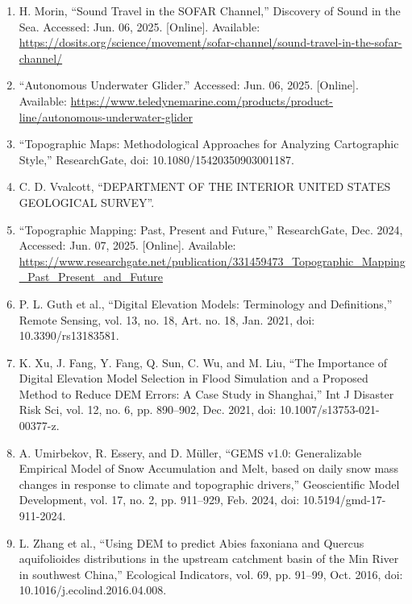 \documentclass{article}
\begin{document}
\begin{sloppypar}
\begin{enumerate}
    \item{H. Morin, “Sound Travel in the SOFAR Channel,” Discovery of Sound in the Sea. Accessed: Jun. 06, 2025. [Online]. Available: \url{https://dosits.org/science/movement/sofar-channel/sound-travel-in-the-sofar-channel/}}

    \item{“Autonomous Underwater Glider.” Accessed: Jun. 06, 2025. [Online]. Available: \url{https://www.teledynemarine.com/products/product-line/autonomous-underwater-glider}}

    \item{“Topographic Maps: Methodological Approaches for Analyzing Cartographic Style,” ResearchGate, doi: 10.1080/15420350903001187.}

    \item{C. D. Vvalcott, “DEPARTMENT OF THE INTERIOR UNITED STATES GEOLOGICAL SURVEY”.}

    \item{“Topographic Mapping: Past, Present and Future,” ResearchGate, Dec. 2024, Accessed: Jun. 07, 2025. [Online]. Available: \url{https://www.researchgate.net/publication/331459473_Topographic_Mapping_Past_Present_and_Future}}

    \item{P. L. Guth et al., “Digital Elevation Models: Terminology and Definitions,” Remote Sensing, vol. 13, no. 18, Art. no. 18, Jan. 2021, doi: 10.3390/rs13183581.}

    \item{K. Xu, J. Fang, Y. Fang, Q. Sun, C. Wu, and M. Liu, “The Importance of Digital Elevation Model Selection in Flood Simulation and a Proposed Method to Reduce DEM Errors: A Case Study in Shanghai,” Int J Disaster Risk Sci, vol. 12, no. 6, pp. 890–902, Dec. 2021, doi: 10.1007/s13753-021-00377-z.}

    \item{A. Umirbekov, R. Essery, and D. Müller, “GEMS v1.0: Generalizable Empirical Model of Snow Accumulation and Melt, based on daily snow mass changes in response to climate and topographic drivers,” Geoscientific Model Development, vol. 17, no. 2, pp. 911–929, Feb. 2024, doi: 10.5194/gmd-17-911-2024.}

    \item{L. Zhang et al., “Using DEM to predict Abies faxoniana and Quercus aquifolioides distributions in the upstream catchment basin of the Min River in southwest China,” Ecological Indicators, vol. 69, pp. 91–99, Oct. 2016, doi: 10.1016/j.ecolind.2016.04.008.}


\end{enumerate}
\end{sloppypar}
\end{document}
